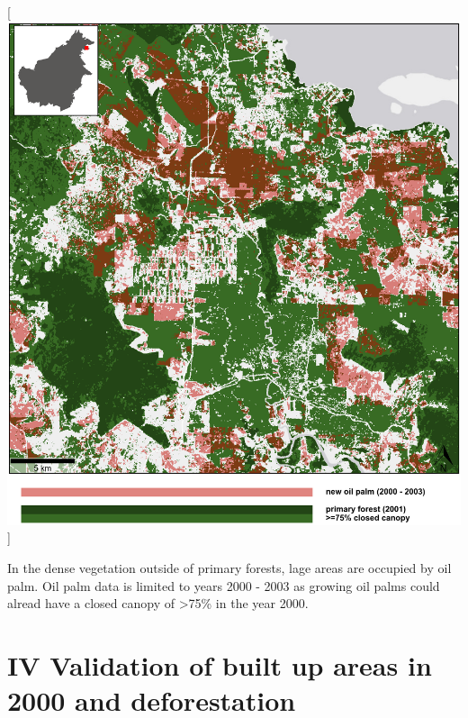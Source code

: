 \documentclass[
  letterpaper,
  DIV=11,
  numbers=noendperiod]{scrreprt}
\begin{document}

\color{white}

{[}\includegraphics[width=1\textwidth,height=\textheight]{text/../code/results/maps/validation_built_up_deforestation.png}{]}
\normalcolor

In the dense vegetation outside of primary forests, lage areas are
occupied by oil palm. Oil palm data is limited to years 2000 - 2003 as
growing oil palms could alread have a closed canopy of \textgreater75\%
in the year 2000. \newpage

\hypertarget{validation-of-built-up-areas-in-2000-and-deforestation}{%
\section*{\texorpdfstring{\textsc{IV} Validation of built up areas in
2000 and
deforestation}{ Validation of built up areas in 2000 and deforestation}}\label{validation-of-built-up-areas-in-2000-and-deforestation}}


\color{white}
\end{document}
